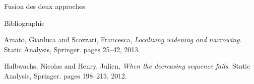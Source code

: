 \documentclass{beamer}
\begin{document}
\begin{frame}{Fusion des deux approches}



\end{frame}




\begin{frame}{Bibliographie}
  
  \begin{thebibliography}{9}
    Amato, Gianluca and Scozzari, Francesca,
    \emph{Localizing widening and narrowing}.
    Static Analysis, Springer.
    pages 25--42,
    2013.

    Halbwachs, Nicolas and Henry, Julien,
    \emph{When the decreasing sequence fails}.
    Static Analysis, Springer.
    pages 198--213,
    2012.
  \end{thebibliography}

\end{frame}
\end{document}
